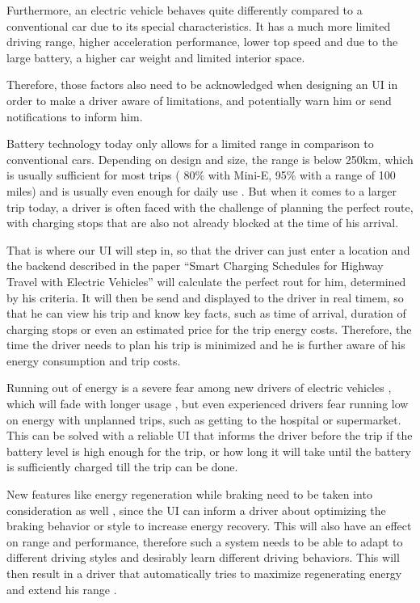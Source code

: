 Furthermore, an electric vehicle behaves quite differently compared to a conventional car due to its special characteristics. It has a much more limited driving range, higher acceleration performance, lower top speed and due to the large battery, a higher car weight and limited interior space.

Therefore, those factors also need to be acknowledged when designing an UI in order to make a driver aware of limitations, and potentially warn him or send notifications to inform him. 

Battery technology today only allows for a limited range in comparison to conventional cars. Depending on design and size, the range is below 250km, which is usually sufficient for most trips (\cite{driver-4} 80\% with Mini-E, \cite{driver-8} 95\% with a range of 100 miles) and is usually even enough for daily use \cite{driver-5} \cite{driver-6}. But when it comes to a larger trip today, a driver is often faced with the challenge of planning the perfect route, with charging stops that are also not already blocked at the time of his arrival.

That is where our UI will step in, so that the driver can just enter a location and the backend described in the paper ``Smart Charging Schedules for Highway Travel with Electric Vehicles'' \cite{driver-17} will calculate the perfect rout for him, determined by his criteria. It will then be send and displayed to the driver in real timem, so that he can view his trip and know key facts, such as time of arrival, duration of charging stops or even an estimated price for the trip energy costs. Therefore, the time the driver needs to plan his trip is minimized and he is further aware of his energy consumption and trip costs.

Running out of energy is a severe fear among new drivers of electric vehicles \cite{driver-5}, which will fade with longer usage \cite{driver-7}, but even experienced drivers fear running low on energy with unplanned trips, such as getting to the hospital or supermarket. This can be solved with a reliable UI that informs the driver before the trip if the battery level is high enough for the trip, or how long it will take until the battery is sufficiently charged till the trip can be done. 

New features like energy regeneration while braking need to be taken into consideration as well \cite{driver-6}, since the UI can inform a driver about optimizing the braking behavior or style to increase energy recovery. This will also have an effect on range and performance, therefore such a system needs to be able to adapt to different driving styles and desirably learn different driving behaviors. This will then result in a driver that automatically tries to maximize regenerating energy and extend his range \cite{driver-6}.


